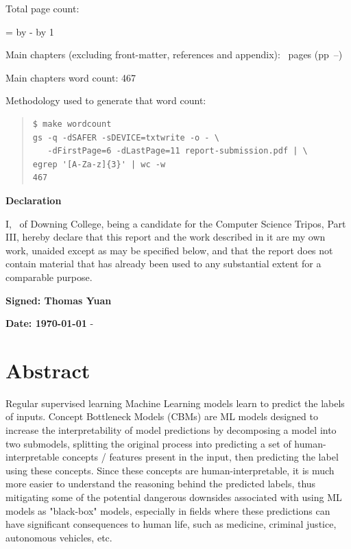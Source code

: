 \documentclass[12pt,a4paper,twoside]{report}
\newif\ifsubmission %
\newcommand{\college}{Downing College}
\newcommand{\course}{Computer Science Tripos, Part III}
\begin{document}
\begin{sffamily}
\newpage

Total page count: \pageref{lastpage}

\makeatletter
\@tempcnta=\relax%
\advance\@tempcnta by -%
\advance\@tempcnta by 1%
\xdef\contentpages{\the\@tempcnta}%
\makeatother

Main chapters (excluding front-matter, references and appendix):
\contentpages~pages
(pp~\pageref{firstcontentpage}--\pageref{lastcontentpage})

Main chapters word count: 467

Methodology used to generate that word count:

\begin{quote}
\begin{verbatim}
$ make wordcount
gs -q -dSAFER -sDEVICE=txtwrite -o - \
   -dFirstPage=6 -dLastPage=11 report-submission.pdf | \
egrep '[A-Za-z]{3}' | wc -w
467
\end{verbatim}
\end{quote}


\end{sffamily}

\vspace{\fill}
\onehalfspacing
\ifsubmission\else\makeatletter
\textbf{\Huge Declaration}
\vspace{40pt}

I, \@author\ of \college, being a candidate for the \course, hereby
declare that this report and the work described in it are my own work,
unaided except as may be specified below, and that the report does not
contain material that has already been used to any substantial extent
for a comparable purpose.


\bigskip 
\textbf{Signed: Thomas Yuan}

\bigskip
\textbf{Date: \today}
\vspace{\fill}
\makeatother\fi-

\chapter*{Abstract}

Regular supervised learning Machine Learning models learn to 
predict the labels of inputs.
Concept Bottleneck Models (CBMs) are ML models designed
to increase the interpretability of model predictions by decomposing a model into
two submodels, splitting the original process into predicting a set of human-interpretable
concepts / features present in the input, then predicting the label using these concepts.
Since these concepts are human-interpretable, it is much more easier to understand
the reasoning behind the predicted labels, thus mitigating some of the
potential dangerous downsides associated with using ML models as "black-box" models,
especially in fields where these predictions can have significant consequences to
human life, such as medicine, criminal justice, autonomous vehicles, etc. 
\end{document}
